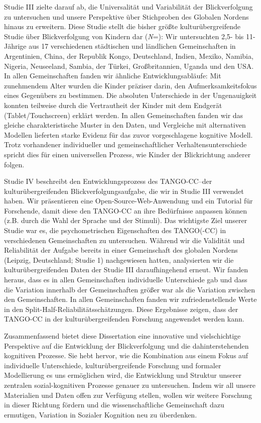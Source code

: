 \documentclass[
]{scrbook}
\begin{document}
Studie III zielte darauf ab, die Universalität und Variabilität der Blickverfolgung zu untersuchen und unsere Perspektive über Stichproben des Globalen Nordens hinaus zu erweitern. Diese Studie stellt die bisher größte kulturübergreifende Studie über Blickverfolgung von Kindern dar (\emph{N}\thinspace =): Wir untersuchten 2,5- bis 11-Jährige aus 17 verschiedenen städtischen und ländlichen Gemeinschaften in Argentinien, China, der Republik Kongo, Deutschland, Indien, Mexiko, Namibia, Nigeria, Neuseeland, Sambia, der Türkei, Großbritannien, Uganda und den USA. In allen Gemeinschaften fanden wir ähnliche Entwicklungsabläufe: Mit zunehmendem Alter wurden die Kinder präziser darin, den Aufmerksamkeitsfokus eines Gegenübers zu bestimmen. Die absoluten Unterschiede in der Ungenauigkeit konnten teilweise durch die Vertrautheit der Kinder mit dem Endgerät (Tablet/Touchscreen) erklärt werden. In allen Gemeinschaften fanden wir das gleiche charakteristische Muster in den Daten, und Vergleiche mit alternativen Modellen lieferten starke Evidenz für das zuvor vorgeschlagene kognitive Modell. Trotz vorhandener individueller und gemeinschaftlicher Verhaltensunterschiede spricht dies für einen universellen Prozess, wie Kinder der Blickrichtung anderer folgen.

Studie IV beschreibt den Entwicklungsprozess des TANGO-CC\thinspace --\thinspace der kulturübergreifenden Blickverfolgungsaufgabe, die wir in Studie III verwendet haben. Wir präsentieren eine Open-Source-Web-Anwendung und ein Tutorial für Forschende, damit diese den TANGO-CC an ihre Bedürfnisse anpassen können (z.B. durch die Wahl der Sprache und der Stimuli). Das wichtigste Ziel unserer Studie war es, die psychometrischen Eigenschaften des TANGO(-CC) in verschiedenen Gemeinschaften zu untersuchen. Während wir die Validität und Reliabilität der Aufgabe bereits in einer Gemeinschaft des globalen Nordens (Leipzig, Deutschland; Studie 1) nachgewiesen hatten, analysierten wir die kulturübergreifenden Daten der Studie III daraufhingehend erneut. Wir fanden heraus, dass es in allen Gemeinschaften individuelle Unterschiede gab und dass die Variation innerhalb der Gemeinschaften größer war als die Variation zwischen den Gemeinschaften. In allen Gemeinschaften fanden wir zufriedenstellende Werte in den Split-Half-Reliabilitätsschätzungen. Diese Ergebnisse zeigen, dass der TANGO-CC in der kulturübergreifenden Forschung angewendet werden kann.

Zusammenfassend bietet diese Dissertation eine innovative und vielschichtige Perspektive auf die Entwicklung der Blickverfolgung und die dahinterstehenden kognitiven Prozesse. Sie hebt hervor, wie die Kombination aus einem Fokus auf individuelle Unterschiede, kulturübergreifende Forschung und formaler Modellierung es uns ermöglichen wird, die Entwicklung und Struktur unserer zentralen sozial-kognitiven Prozesse genauer zu untersuchen. Indem wir all unsere Materialien und Daten offen zur Verfügung stellen, wollen wir weitere Forschung in dieser Richtung fördern und die wissenschaftliche Gemeinschaft dazu ermutigen, Variation in Sozialer Kognition neu zu überdenken.
\end{document}
